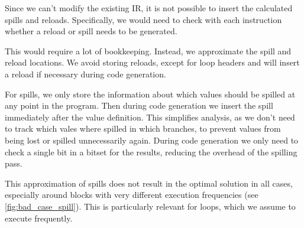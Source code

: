 Since we can't modify the existing IR, it is not possible to insert the calculated spills and reloads. Specifically, we would need to check with each instruction whether a reload or spill needs to be generated.

This would require a lot of bookkeeping. Instead, we approximate the spill and reload locations. We avoid storing reloads, except for loop headers and will insert a reload if necessary during code generation.

For spills, we only store the information about which values should be spilled at any point in the program. Then during code generation we insert the spill immediately after the value definition. This simplifies analysis, as we don't need to track which vales where spilled in which branches, to prevent values from being lost or spilled unnecessarily again. During code generation we only need to check a single bit in a bitset for the results, reducing the overhead of the spilling pass.

This approximation of spills does not result in the optimal solution in all cases, especially around blocks with very different execution frequencies (see \autoref{fig:bad_case_spill}). This is particularly relevant for loops, which we assume to execute frequently.

